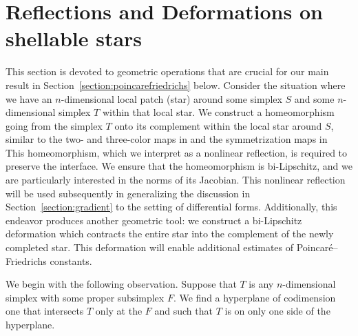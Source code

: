 \documentclass[10pt,a4paper]{article}
\begin{document}
 




















\section{Reflections and Deformations on shellable stars}\label{section:extension}

This section is devoted to geometric operations that are crucial for our main result in Section~\ref{section:poincarefriedrichs} below. 
Consider the situation where we have an $n$-dimensional local patch (star) around some simplex $S$ and some $n$-dimensional simplex $T$ within that local star. 
We construct a homeomorphism going from the simplex $T$ onto its complement within the local star around $S$,
similar to the two- and three-color maps in \cite[Sections~5.3 and~6.3]{ern2020stable} and the symmetrization maps in~\cite[Section~7.6]{Chaum_Voh_p_rob_3D_H_curl_24}
This homeomorphism, which we interpret as a nonlinear reflection, is required to preserve the interface. 
We ensure that the homeomorphism is bi-Lipschitz, and we are particularly interested in the norms of its Jacobian.
This nonlinear reflection will be used subsequently in generalizing the discussion in Section~\ref{section:gradient} to the setting of differential forms. 
Additionally, this endeavor produces another geometric tool:
we construct a bi-Lipschitz deformation which contracts the entire star into the complement of the newly completed star. 
This deformation will enable additional estimates of Poincar\'e--Friedrichs constants. 

We begin with the following observation. 
Suppose that $T$ is any $n$-dimensional simplex with some proper subsimplex $F$.
We find a hyperplane of codimension one that intersects $T$ only at the $F$ and such that $T$ is on only one side of the hyperplane. 
\end{document}
